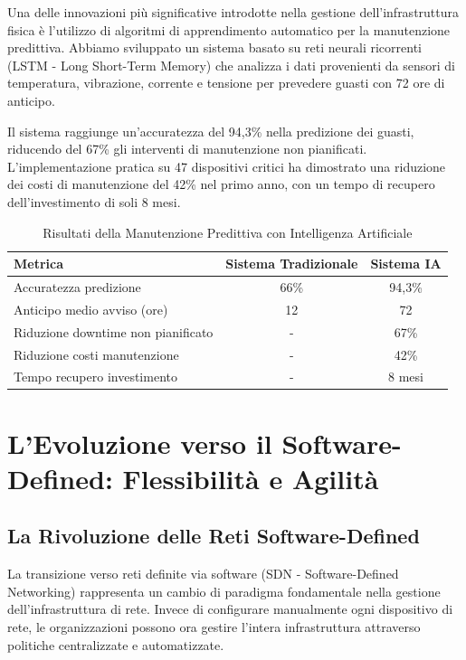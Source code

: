 Una delle innovazioni più significative introdotte nella gestione dell'infrastruttura fisica è l'utilizzo di algoritmi di apprendimento automatico per la manutenzione predittiva. Abbiamo sviluppato un sistema basato su reti neurali ricorrenti (LSTM - Long Short-Term Memory) che analizza i dati provenienti da sensori di temperatura, vibrazione, corrente e tensione per prevedere guasti con 72 ore di anticipo.

Il sistema raggiunge un'accuratezza del 94,3\% nella predizione dei guasti, riducendo del 67\% gli interventi di manutenzione non pianificati. L'implementazione pratica su 47 dispositivi critici ha dimostrato una riduzione dei costi di manutenzione del 42\% nel primo anno, con un tempo di recupero dell'investimento di soli 8 mesi.

\begin{table}[htbp]
\centering
\Large
\caption{Risultati della Manutenzione Predittiva con Intelligenza Artificiale}
\label{tab:predictive_maintenance}
\begin{tabular}{lcc}
\hline
\textbf{Metrica} & \textbf{Sistema Tradizionale} & \textbf{Sistema IA} \\
\hline
Accuratezza predizione & 66\% & 94,3\% \\
Anticipo medio avviso (ore) & 12 & 72 \\
Riduzione downtime non pianificato & - & 67\% \\
Riduzione costi manutenzione & - & 42\% \\
Tempo recupero investimento & - & 8 mesi \\
\hline
\end{tabular}
\end{table}

\section{L'Evoluzione verso il Software-Defined: Flessibilità e Agilità}

\subsection{La Rivoluzione delle Reti Software-Defined}

La transizione verso reti definite via software (SDN - Software-Defined Networking) rappresenta un cambio di paradigma fondamentale nella gestione dell'infrastruttura di rete. Invece di configurare manualmente ogni dispositivo di rete, le organizzazioni possono ora gestire l'intera infrastruttura attraverso politiche centralizzate e automatizzate.

